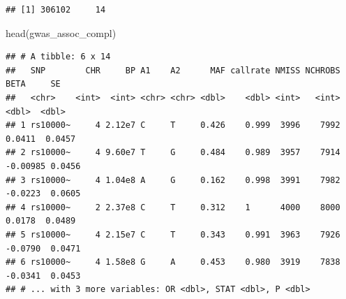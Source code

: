 \documentclass[
]{book}
\newenvironment{Shaded}{\begin{snugshade}}{\end{snugshade}}
\newcommand{\CommentTok}[1]{\textcolor[rgb]{0.56,0.35,0.01}{\textit{#1}}}
\newcommand{\FunctionTok}[1]{\textcolor[rgb]{0.00,0.00,0.00}{#1}}
\newcommand{\NormalTok}[1]{#1}
\newcommand{\OtherTok}[1]{\textcolor[rgb]{0.56,0.35,0.01}{#1}}
\newcommand{\SpecialCharTok}[1]{\textcolor[rgb]{0.00,0.00,0.00}{#1}}
\newcommand{\StringTok}[1]{\textcolor[rgb]{0.31,0.60,0.02}{#1}}
\begin{document}
\begin{Shaded}
\end{Shaded}

\begin{verbatim}
## [1] 306102     14
\end{verbatim}

\begin{Shaded}
\begin{Highlighting}[]
\FunctionTok{head}\NormalTok{(gwas\_assoc\_compl)}
\end{Highlighting}
\end{Shaded}

\begin{verbatim}
## # A tibble: 6 x 14
##   SNP        CHR     BP A1    A2      MAF callrate NMISS NCHROBS     BETA     SE
##   <chr>    <int>  <int> <chr> <chr> <dbl>    <dbl> <int>   <int>    <dbl>  <dbl>
## 1 rs10000~     4 2.12e7 C     T     0.426    0.999  3996    7992  0.0411  0.0457
## 2 rs10000~     4 9.60e7 T     G     0.484    0.989  3957    7914 -0.00985 0.0456
## 3 rs10000~     4 1.04e8 A     G     0.162    0.998  3991    7982 -0.0223  0.0605
## 4 rs10000~     2 2.37e8 C     T     0.312    1      4000    8000  0.0178  0.0489
## 5 rs10000~     4 2.15e7 C     T     0.343    0.991  3963    7926 -0.0790  0.0471
## 6 rs10000~     4 1.58e8 G     A     0.453    0.980  3919    7838 -0.0341  0.0453
## # ... with 3 more variables: OR <dbl>, STAT <dbl>, P <dbl>
\end{verbatim}
\end{document}
